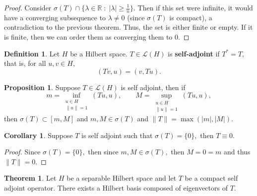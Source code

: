 \documentclass[10pt, oneside]{article}
\newcommand{\bbR}{\mathbb{R}}
\theoremstyle{definition}
\newtheorem{thm}{Theorem}
\newtheorem{defn}{Definition}
\newtheorem{prop}{Proposition}
\newtheorem{cor}{Corollary}
\begin{document}
\begin{proof}
    Consider $\sigma(T)\cap \{\lambda \in \bbR \; : \; |\lambda| \geq \frac{1}{n}\}.$ Then if this set were infinite, it would have a converging subsequence to $\lambda \neq 0$ (since $\sigma(T)$ is compact), a contradiction to the previous theorem. Thus, the set is either finite or empty. If it is finite, then we can order them as converging them to $0.$
\end{proof}
\begin{defn}
Let $H$ be a Hilbert space. $T\in \mathcal{L}(H)$ is \textbf{self-adjoint} if $T^* = T,$ that is, for all $u,v \in H,$ 
\[(Tv, u) = (v, Tu).\]
\end{defn}

\begin{prop}
    Suppose $T\in \mathcal{L}(H)$ is self adjoint, then if 
    \[m = \inf_{\substack{u \in H \\\|u\| = 1}}(Tu, u), \qquad M = \sup_{\substack{u \in H \\\|u\| = 1}}(Tu, u), \] then $\sigma(T)\subset [m, M]$ and $m, M \in \sigma(T)$ and $\|T\| = \max(|m|, |M|).$
\end{prop}

\begin{cor}
    Suppose $T$ is self adjoint such that $\sigma(T) = \{0\},$ then $T \equiv 0.$
\end{cor}
\begin{proof}
    Since $\sigma(T)= \{0\},$ then since $m,M \in \sigma(T),$ then $M = 0 = m$ and thus $\|T\| = 0.$
\end{proof}

\begin{thm}
    Let $H$ be a separable Hilbert space and let $T$ be a compact self adjoint operator. There exists a Hilbert basis composed of eigenvectors of $T.$
\end{thm}
\end{document}

